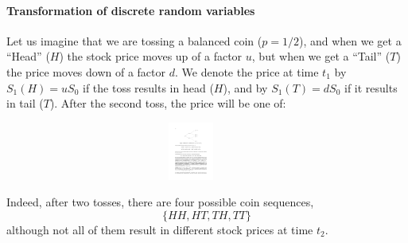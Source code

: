 \documentclass[smaller]{beamer}\usepackage[]{graphicx}\usepackage[]{color}
\begin{document}
\begin{frame}{\secname}
\framesubtitle{Transformation of discrete random variables}
\begin{example} 

Let us imagine that we are tossing a balanced coin ($p=1/2$), and when we get a ``Head'' ($H$) the stock price moves up of a factor $u$, but when we get a ``Tail'' ($T$) the price moves down of a factor $d$. We denote the price at time $t_1$  by $S_1(H)=u S_0 $ if the toss results in head ($H$), and by $S_1(T)=d S_0 $  if it results in tail ($T$). After the second toss, the price will be one of:
\begin{figure}[ptb]\centering
\includegraphics[height=0.75in, width=4in]{img/Shreve_Bin.pdf}%
\end{figure}%
Indeed, after two tosses, there are four possible coin sequences,
$$
\{HH,HT,TH,TT\}
$$
although not all of them result in different stock prices at time  $t_2$.
%
\end{example}
\end{frame}%
\end{document}
